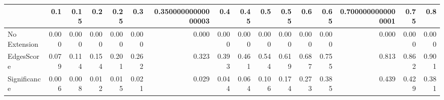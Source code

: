 \begin{tabular}{lrrrrrrrrrrrrrrr}
\toprule
{} &   0.1 &  0.15 &   0.2 &  0.25 &   0.3 & 0.35000000000000003 &   0.4 &  0.45 &   0.5 &  0.55 &   0.6 &  0.65 & 0.7000000000000001 &  0.75 &   0.8 \\
\midrule
No Extension & 0.000 & 0.000 & 0.000 & 0.000 & 0.000 &               0.000 & 0.000 & 0.000 & 0.000 & 0.000 & 0.000 & 0.000 &              0.000 & 0.000 & 0.000 \\
EdgesScore   & 0.079 & 0.114 & 0.154 & 0.201 & 0.262 &               0.323 & 0.393 & 0.461 & 0.544 & 0.619 & 0.687 & 0.755 &              0.813 & 0.862 & 0.901 \\
Significance & 0.006 & 0.008 & 0.012 & 0.015 & 0.021 &               0.029 & 0.044 & 0.064 & 0.106 & 0.174 & 0.273 & 0.385 &              0.439 & 0.429 & 0.381 \\
\bottomrule
\end{tabular}
